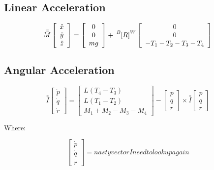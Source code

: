 \documentclass{article}
\numberwithin{equation}{section}
\newcommand{\BtoW}{
\tensor[^B]{\left[R\right]}{^W}
}
\newcommand{\omegaVec}{
\left[ \begin{array}{ccc}
p\\
q\\
r \end{array} \right]
}
\begin{document}
\subsection{Linear Acceleration}

\begin{equation}
  \label{linAccel}
  \bar{\bar{M}} \left[ \begin{array}{ccc} 
           \ddot{x} \\ 
           \ddot{y} \\ 
           \ddot{z} \end{array} \right] 
           =
   \left[ \begin{array}{ccc}
          0 \\
          0 \\
          mg \end{array} \right]
          +
    \BtoW \left[\begin{array}{ccc}
         0 \\
         0 \\
         -T_1 - T_2 - T_3 - T_4
         \end{array}\right]
\end{equation}

\subsection{Angular Acceleration}
\begin{equation}
  \label{angAccel}
  \bar{\bar{I}} \left[ \begin{array}{ccc} \dot{p} \\ 
  							\dot{q} \\ 
							\dot{r} \end{array} \right]
  =
  \left[ \begin{array}{ccc} L\left(T_4 - T_3\right) \\ 
  				      L\left(T_1 - T_2\right) \\ 
				      M_1 + M_2 - M_3 - M_4 \end{array} \right]
				      -
				      \omegaVec \times \bar{\bar{I}} \omegaVec
\end{equation}
  
Where:

\begin{equation}
    \label{omegaDot}
    \left[ \begin{array}{ccc} \dot{p} \\ 
  					\dot{q} \\ 
					\dot{r} \end{array} \right]
					=
					nasty vector I need to look up again
\end{equation}
\end{document}
